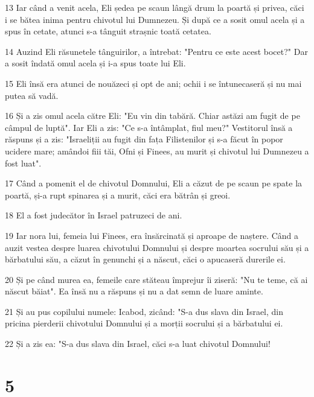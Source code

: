 \par 13 Iar când a venit acela, Eli ședea pe scaun lângă drum la poartă și privea, căci i se bătea inima pentru chivotul lui Dumnezeu. Și după ce a sosit omul acela și a spus în cetate, atunci s-a tânguit strașnic toată cetatea.
\par 14 Auzind Eli răsunetele tânguirilor, a întrebat: "Pentru ce este acest bocet?" Dar a sosit îndată omul acela și i-a spus toate lui Eli.
\par 15 Eli însă era atunci de nouăzeci și opt de ani; ochii i se întunecaseră și nu mai putea să vadă.
\par 16 Și a zis omul acela către Eli: "Eu vin din tabără. Chiar astăzi am fugit de pe câmpul de luptă". Iar Eli a zis: "Ce s-a întâmplat, fiul meu?" Vestitorul însă a răspuns și a zis: "Israeliții au fugit din fața Filistenilor și s-a făcut în popor ucidere mare; amândoi fiii tăi, Ofni și Finees, au murit și chivotul lui Dumnezeu a fost luat".
\par 17 Când a pomenit el de chivotul Domnului, Eli a căzut de pe scaun pe spate la poartă, și-a rupt spinarea și a murit, căci era bătrân și greoi.
\par 18 El a fost judecător în Israel patruzeci de ani.
\par 19 Iar nora lui, femeia lui Finees, era însărcinată și aproape de naștere. Când a auzit vestea despre luarea chivotului Domnului și despre moartea socrului său și a bărbatului său, a căzut în genunchi și a născut, căci o apucaseră durerile ei.
\par 20 Și pe când murea ea, femeile care stăteau împrejur îi ziseră: "Nu te teme, că ai născut băiat". Ea însă nu a răspuns și nu a dat semn de luare aminte.
\par 21 Și au pus copilului numele: Icabod, zicând: "S-a dus slava din Israel, din pricina pierderii chivotului Domnului și a morții socrului și a bărbatului ei.
\par 22 Și a zis ea: "S-a dus slava din Israel, căci s-a luat chivotul Domnului!

\chapter{5}

